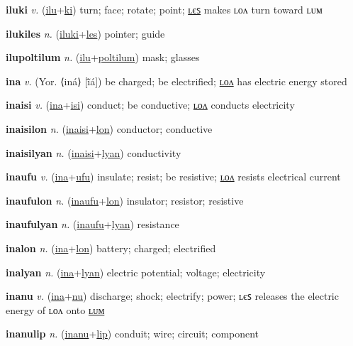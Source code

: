 \textbf{\hypertarget{iluki}{iluki}} \textit{v.} (\hyperlink{ilu}{ilu}+\allowbreak \hyperlink{ki}{ki})
turn; face; rotate; point; \hyperlink{ilukiles}{ʟєꜱ} makes ʟᴏᴧ turn toward ʟᴜᴍ

\textbf{\hypertarget{ilukiles}{ilukiles}} \textit{n.} (\hyperlink{iluki}{iluki}+\allowbreak \hyperlink{les}{les})
pointer; guide

\textbf{\hypertarget{ilupoltilum}{ilupoltilum}} \textit{n.} (\hyperlink{ilu}{ilu}+\allowbreak \hyperlink{poltilum}{poltilum})
mask; glasses

\textbf{\hypertarget{ina}{ina}} \textit{v.} (Yor. ⟨iná⟩ [ĩ̄á])
be charged; be electrified; \hyperlink{inalon}{ʟᴏᴧ} has electric energy stored

\textbf{\hypertarget{inaisi}{inaisi}} \textit{v.} (\hyperlink{ina}{ina}+\allowbreak \hyperlink{isi}{isi})
conduct; be conductive; \hyperlink{inaisilon}{ʟᴏᴧ} conducts electricity

\textbf{\hypertarget{inaisilon}{inaisilon}} \textit{n.} (\hyperlink{inaisi}{inaisi}+\allowbreak \hyperlink{lon}{lon})
conductor; conductive

\textbf{\hypertarget{inaisilyan}{inaisilyan}} \textit{n.} (\hyperlink{inaisi}{inaisi}+\allowbreak \hyperlink{lyan}{lyan})
conductivity

\textbf{\hypertarget{inaufu}{inaufu}} \textit{v.} (\hyperlink{ina}{ina}+\allowbreak \hyperlink{ufu}{ufu})
insulate; resist; be resistive; \hyperlink{inaufulon}{ʟᴏᴧ} resists electrical current

\textbf{\hypertarget{inaufulon}{inaufulon}} \textit{n.} (\hyperlink{inaufu}{inaufu}+\allowbreak \hyperlink{lon}{lon})
insulator; resistor; resistive

\textbf{\hypertarget{inaufulyan}{inaufulyan}} \textit{n.} (\hyperlink{inaufu}{inaufu}+\allowbreak \hyperlink{lyan}{lyan})
resistance

\textbf{\hypertarget{inalon}{inalon}} \textit{n.} (\hyperlink{ina}{ina}+\allowbreak \hyperlink{lon}{lon})
battery; charged; electrified

\textbf{\hypertarget{inalyan}{inalyan}} \textit{n.} (\hyperlink{ina}{ina}+\allowbreak \hyperlink{lyan}{lyan})
electric potential; voltage; electricity

\textbf{\hypertarget{inanu}{inanu}} \textit{v.} (\hyperlink{ina}{ina}+\allowbreak \hyperlink{nu}{nu})
discharge; shock; electrify; power; ʟєꜱ releases the electric energy of ʟᴏᴧ onto \hyperlink{inanulum}{ʟᴜᴍ}

\textbf{\hypertarget{inanulip}{inanulip}} \textit{n.} (\hyperlink{inanu}{inanu}+\allowbreak \hyperlink{lip}{lip})
conduit; wire; circuit; component

